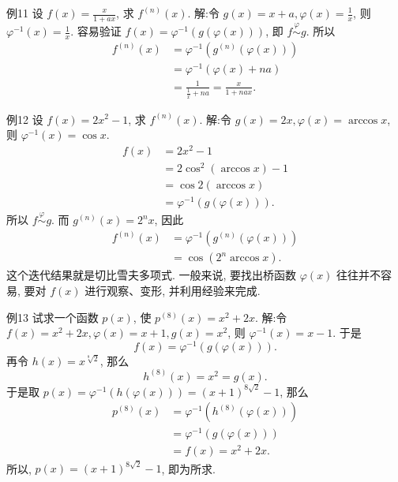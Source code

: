 例11 设 $f(x)=\frac{x}{1+a x}$, 求 $f^{(n)}(x)$.
解:令 $g(x)=x+a, \varphi(x)=\frac{1}{x}$, 则 $\varphi^{-1}(x)=\frac{1}{x}$. 容易验证 $f(x)= \varphi^{-1}(g(\varphi(x)))$, 即 $f \stackrel{\varphi}{\sim} g$. 所以
$$
\begin{aligned}
f^{(n)}(x) & =\varphi^{-1}\left(g^{(n)}(\varphi(x))\right) \\
& =\varphi^{-1}(\varphi(x)+n a) \\
& =\frac{1}{\frac{1}{x}+n a}=\frac{x}{1+n a x} .
\end{aligned}
$$



例12 设 $f(x)=2 x^2-1$, 求 $f^{(n)}(x)$.
解:令 $g(x)=2 x, \varphi(x)=\arccos x$, 则 $\varphi^{-1}(x)=\cos x$.
$$
\begin{aligned}
f(x) & =2 x^2-1 \\
& =2 \cos ^2(\arccos x)-1 \\
& =\cos 2(\arccos x) \\
& =\varphi^{-1}(g(\varphi(x))) .
\end{aligned}
$$
所以 $f \stackrel{\varphi}{\sim} g$. 而 $g^{(n)}(x)=2^n x$, 因此
$$
\begin{aligned}
f^{(n)}(x) & =\varphi^{-1}\left(g^{(n)}(\varphi(x))\right) \\
& =\cos \left(2^n \arccos x\right) .
\end{aligned}
$$
这个迭代结果就是切比雪夫多项式.
一般来说, 要找出桥函数 $\varphi(x)$ 往往并不容易, 要对 $f(x)$ 进行观察、变形, 并利用经验来完成.



例13 试求一个函数 $p(x)$, 使 $p^{(8)}(x)=x^2+2 x$.
解:令 $f(x)=x^2+2 x, \varphi(x)=x+1, g(x)=x^2$, 则 $\varphi^{-1}(x)=x-1$.
于是
$$
f(x)=\varphi^{-1}(g(\varphi(x))) .
$$
再令 $h(x)=x^{\sqrt[8]{2}}$, 那么
$$
h^{(8)}(x)=x^2=g(x) .
$$
于是取 $p(x)=\varphi^{-1}(h(\varphi(x)))=(x+1)^{8 \sqrt{2}}-1$, 那么
$$
\begin{aligned}
p^{(8)}(x) & =\varphi^{-1}\left(h^{(8)}(\varphi(x))\right) \\
& =\varphi^{-1}(g(\varphi(x))) \\
& =f(x)=x^2+2 x .
\end{aligned}
$$
所以, $p(x)=(x+1)^{8 \sqrt{2}}-1$, 即为所求.



